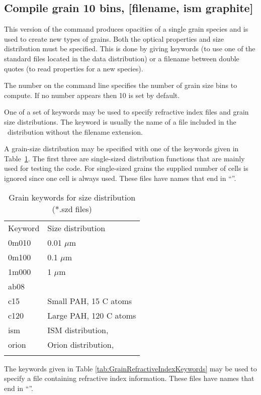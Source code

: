 \subsection{Compile grain 10 bins, [filename, ism graphite]}

This version of the command produces opacities of a single grain species
and is used to create new types of grains.
Both the optical properties
and size distribution must be specified.
This is done by giving keywords
(to use one of the standard files located in the data distribution)
or a filename between double quotes (to read properties for a new species).

The number on the command line specifies the number of
grain size bins to compute.
If no number appears then 10 is set by default.

One of a set of keywords may be used to
specify refractive index files and grain size distributions.
The keyword is usually the
name of a file included in the \Cloudy\ distribution
without the filename extension.

A grain-size
distribution may be specified with one of the keywords given in
Table~\ref{tab:GrainSizeDistributionKeywords}.
The first three are single-sized distribution functions that are mainly
used for testing the code.
For single-sized grains the supplied number
of cells is ignored since one cell is always used.
These files have names
that end in ``''.

\begin{table}
\centering
\caption{Grain keywords for size distribution (*.szd files)}
\begin{tabular}{ll}
\hline
Keyword& Size distribution\\
0m010& 0.01 $\mu$m\\
0m100& 0.1 $\mu$m\\
1m000& 1 $\mu$m\\
ab08& \citealp{Abel2008}\\
c15& Small PAH, 15 C atoms\\
c120& Large PAH, 120 C atoms\\
ism& ISM distribution, \citealp{Mathis1977}\\
orion& Orion distribution, \citealp{Baldwin1991}\\
\hline
\label{tab:GrainSizeDistributionKeywords}
\end{tabular}
\end{table}

The keywords given in Table \ref{tab:GrainRefractiveIndexKeywords}
may be used to specify a file containing
refractive index information.
These files have names that end in
``''.

